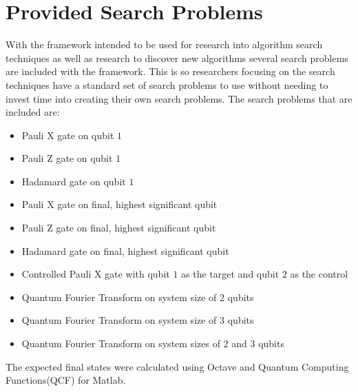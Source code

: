 \section{Provided Search Problems}
\label{sec:provsearchprobs}
With the framework intended to be used for research into algorithm search techniques as well as research to discover new algorithms several search problems are included with the framework.
This is so researchers focusing on the search techniques have a standard set of search problems to use without needing to invest time into creating their own search problems.
The search problems that are included are:
\begin{itemize}
 \item Pauli X gate on qubit $1$
 \item Pauli Z gate on qubit $1$
 \item Hadamard gate on qubit $1$
 \item Pauli X gate on final, highest significant qubit
 \item Pauli Z gate on final, highest significant qubit
 \item Hadamard gate on final, highest significant qubit
 \item Controlled Pauli X gate with qubit $1$ as the target and qubit $2$ as the control
 \item Quantum Fourier Transform on system size of $2$ qubits
 \item Quantum Fourier Transform on system size of $3$ qubits
 \item Quantum Fourier Transform on system sizes of $2$ and $3$ qubits
\end{itemize}

The expected final states were calculated using Octave\cite{octweb} and Quantum Computing Functions(QCF) for Matlab\cite{qcfweb}.

